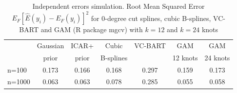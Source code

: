 \begin{table}
\begin{center}
\begin{tabular}{lcccccc}  %
         & Gaussian &  ICAR+ & Cubic    & VC-BART & GAM        & GAM \\ 
         & prior    &  prior & B-splines&         & 12 knots & 24 knots\\   %
n=100    & 0.173    &  0.166 & 0.168    & 0.297   & 0.159      & 0.173  \\ 
n=1000   & 0.063    &  0.063 & 0.078    & 0.285   & 0.055      & 0.058 \\ 
\end{tabular}
\end{center}
\caption{Independent errors simulation. Root Mean Squared Error $E_F\left[ \hat{E}(y_i) - E_F(y_i) \right]^2$ for 0-degree cut splines, cubic B-splines, VC-BART  and GAM (R package mgcv) with $k=12$ and $k=24$ knots }
\label{tab:simiid_mse}
\end{table}


